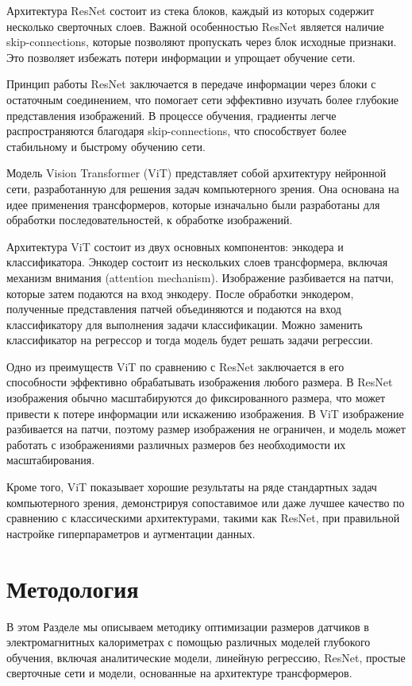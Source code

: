 \documentclass[a4paper,12pt]{extarticle}
\begin{document}
Архитектура ResNet состоит из стека блоков, каждый из которых содержит несколько сверточных слоев. Важной особенностью ResNet является наличие skip-connections, которые позволяют пропускать через блок исходные признаки. Это позволяет избежать потери информации и упрощает обучение сети.

Принцип работы ResNet заключается в передаче информации через блоки с остаточным соединением, что помогает сети эффективно изучать более глубокие представления изображений. В процессе обучения, градиенты легче распространяются благодаря skip-connections, что способствует более стабильному и быстрому обучению сети.

Модель Vision Transformer (ViT) представляет собой архитектуру нейронной сети, разработанную для решения задач компьютерного зрения. Она основана на идее применения трансформеров, которые изначально были разработаны для обработки последовательностей, к обработке изображений.

Архитектура ViT состоит из двух основных компонентов: энкодера и классификатора. Энкодер состоит из нескольких слоев трансформера, включая механизм внимания (attention mechanism). Изображение разбивается на патчи, которые затем подаются на вход энкодеру. После обработки энкодером, полученные представления патчей объединяются и подаются на вход классификатору для выполнения задачи классификации. Можно заменить классификатор на регрессор и тогда модель будет решать задачи регрессии.

Одно из преимуществ ViT по сравнению с ResNet заключается в его способности эффективно обрабатывать изображения любого размера. В ResNet изображения обычно масштабируются до фиксированного размера, что может привести к потере информации или искажению изображения. В ViT изображение разбивается на патчи, поэтому размер изображения не ограничен, и модель может работать с изображениями различных размеров без необходимости их масштабирования.

Кроме того, ViT показывает хорошие результаты на ряде стандартных задач компьютерного зрения, демонстрируя сопоставимое или даже лучшее качество по сравнению с классическими архитектурами, такими как ResNet, при правильной настройке гиперпараметров и аугментации данных.

\section{Методология}
\label{section:method}

В этом Разделе мы описываем методику оптимизации размеров датчиков в электромагнитных калориметрах с помощью различных моделей глубокого обучения, включая аналитические модели, линейную регрессию, ResNet, простые сверточные сети и модели, основанные на архитектуре трансформеров.
\end{document}
